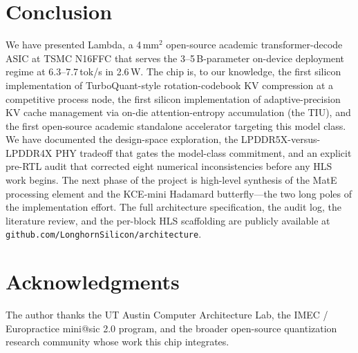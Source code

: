 \documentclass[conference]{IEEEtran}
\begin{document}
\section{Conclusion}

We have presented Lambda, a 4\,mm$^2$ open-source academic transformer-decode ASIC at TSMC N16FFC that serves the 3--5\,B-parameter on-device deployment regime at 6.3--7.7\,tok/s in 2.6\,W. The chip is, to our knowledge, the first silicon implementation of TurboQuant-style rotation-codebook KV compression at a competitive process node, the first silicon implementation of adaptive-precision KV cache management via on-die attention-entropy accumulation (the TIU), and the first open-source academic standalone accelerator targeting this model class. We have documented the design-space exploration, the LPDDR5X-versus-LPDDR4X PHY tradeoff that gates the model-class commitment, and an explicit pre-RTL audit that corrected eight numerical inconsistencies before any HLS work begins. The next phase of the project is high-level synthesis of the MatE processing element and the KCE-mini Hadamard butterfly---the two long poles of the implementation effort. The full architecture specification, the audit log, the literature review, and the per-block HLS scaffolding are publicly available at \texttt{github.com/LonghornSilicon/architecture}.

\section*{Acknowledgments}

The author thanks the UT Austin Computer Architecture Lab, the IMEC / Europractice mini@sic 2.0 program, and the broader open-source quantization research community whose work this chip integrates.



\end{document}
